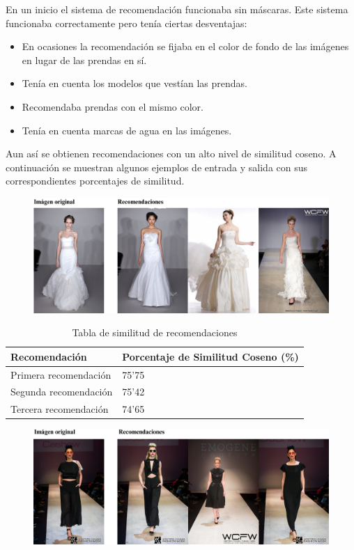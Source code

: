 \documentclass[12pt]{report} %
\begin{document}
	En un inicio el sistema de recomendación funcionaba sin máscaras. Este sistema funcionaba correctamente pero
	tenía ciertas desventajas:
	\begin{itemize}
		\item En ocasiones la recomendación se fijaba en el color de fondo de las imágenes en lugar de las prendas en sí.
		\item Tenía en cuenta los modelos que vestían las prendas.
		\item Recomendaba prendas con el mismo color.
		\item Tenía en cuenta marcas de agua en las imágenes.
	\end{itemize}
	Aun así se obtienen recomendaciones con un alto nivel de similitud coseno. A continuación se muestran algunos ejemplos
	de entrada y salida con sus correspondientes porcentajes de similitud.
	\begin{figure}[H]
		{\includegraphics[scale=0.5]{recomendacion1.png}}
	\end{figure}
	\begin{table}[H]
		\centering
		\caption{Tabla de similitud de recomendaciones}
		\begin{tabular}{ll}
				\textbf{Recomendación} & \textbf{Porcentaje de Similitud Coseno (\%)} \\
				\midrule
				Primera recomendación & 75'75 \\
				Segunda recomendación & 75'42 \\
				Tercera recomendación & 74'65 \\
				\bottomrule
		\end{tabular}
	\end{table}
	\begin{figure}[H]
		{\includegraphics[scale=0.6]{recomendacion2.png}}
	\end{figure}
\end{document}
